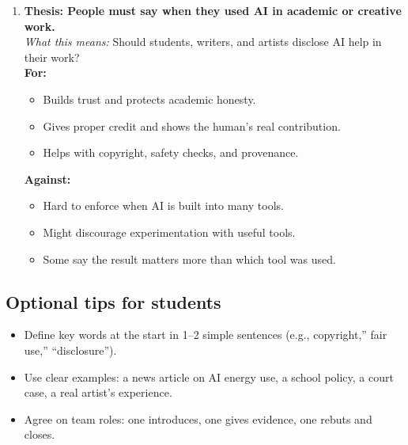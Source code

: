 \documentclass[12pt]{article}
\begin{document}
\begin{enumerate}
\item \textbf{Thesis: People must say when they used AI in academic or creative work.}\\
\emph{What this means:} Should students, writers, and artists disclose AI help in their work?\\
\textbf{For:}
\begin{itemize}
    \item Builds trust and protects academic honesty.
    \item Gives proper credit and shows the human’s real contribution.
    \item Helps with copyright, safety checks, and provenance.
\end{itemize}
\textbf{Against:}
\begin{itemize}
    \item Hard to enforce when AI is built into many tools.
    \item Might discourage experimentation with useful tools.
    \item Some say the result matters more than which tool was used.
\end{itemize}

\end{enumerate}


\subsection*{Optional tips for students}
\begin{itemize}
\item Define key words at the start in 1--2 simple sentences (e.g., copyright,'' fair use,'' ``disclosure'').
\item Use clear examples: a news article on AI energy use, a school policy, a court case, a real artist’s experience.
\item Agree on team roles: one introduces, one gives evidence, one rebuts and closes.
\end{itemize}
\end{document}
